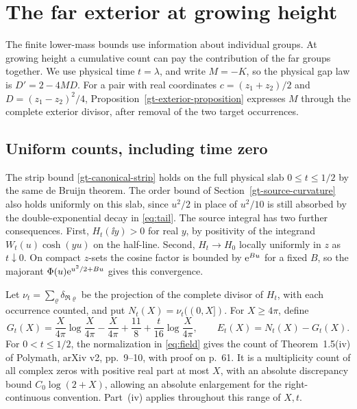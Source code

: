 \section{The far exterior at growing height}
\label{sec:gt-height}

The finite lower-mass bounds use information about individual groups.
At growing height a cumulative count can pay the contribution of the
far groups together. We use physical time \(t=\lambda\), and write
\(M=-K\), so the physical gap law is \(D'=2-4MD\). For a pair with
real coordinates \(c=(z_1+z_2)/2\) and \(D=(z_1-z_2)^2/4\),
Proposition~\ref{gt-exterior-proposition} expresses \(M\) through the
complete exterior divisor, after removal of the two target occurrences.

\subsection{Uniform counts, including time zero}

The strip bound \eqref{gt-canonical-strip} holds on the full physical
slab \(0\le t\le1/2\) by the same de Bruijn theorem. The order bound
of Section~\ref{gt-source-curvature} also holds uniformly on this
slab, since \(u^2/2\) in place of \(u^2/10\) is still absorbed by
the double-exponential decay in \eqref{eq:tail}. The source integral
has two further consequences. First, \(H_t(\ii y)>0\) for real
\(y\), by positivity of the integrand \(W_t(u)\cosh(yu)\) on the
half-line. Second, \(H_t\to H_0\) locally uniformly in \(z\) as
\(t\downarrow0\). On compact \(z\)-sets the cosine factor is bounded
by \(\mathrm e^{Bu}\) for a fixed \(B\), so the majorant
\(\Phi(u)\mathrm e^{u^2/2+Bu}\) gives this convergence.

Let \(\nu_t=\sum_\varrho\delta_{\Re\varrho}\) be the projection of the
complete divisor of \(H_t\), with each occurrence counted, and put
\(N_t(X)=\nu_t((0,X])\). For \(X\ge4\pi\), define
\begin{equation}
 G_t(X)=\frac{X}{4\pi}\log\frac{X}{4\pi}-\frac{X}{4\pi}
        +\frac{11}{8}+\frac{t}{16}\log\frac{X}{4\pi},
 \qquad E_t(X)=N_t(X)-G_t(X).
 \label{gt-height-main-count}
\end{equation}
For \(0<t\le1/2\), the normalization in \eqref{eq:field} gives the
count of Theorem~1.5(iv) of Polymath, arXiv v2, pp.~9--10, with proof
on p.~61. It is a multiplicity count of all complex zeros with
positive real part at most \(X\), with an absolute discrepancy
bound \(C_0\log(2+X)\), allowing an absolute enlargement for the
right-continuous convention. Part~(iv) applies throughout this range
of \(X,t\). \cite[Theorem~1.5(iv)]{polymath}

